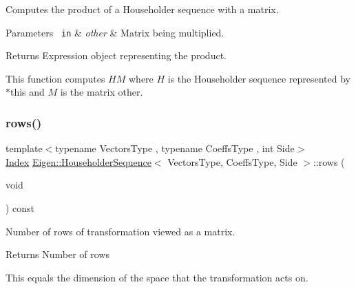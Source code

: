Computes the product of a Householder sequence with a matrix. 


\begin{DoxyParams}[1]{Parameters}
\mbox{\texttt{ in}}  & {\em other} & Matrix being multiplied. \\
\hline
\end{DoxyParams}
\begin{DoxyReturn}{Returns}
Expression object representing the product.
\end{DoxyReturn}
This function computes $ HM $ where $ H $ is the Householder sequence represented by {\ttfamily $\ast$this} and $ M $ is the matrix {\ttfamily other}. \mbox{\label{class_eigen_1_1_householder_sequence_a6eaafe2460930d1f4aa67d6e577b71f0}} 
\subsubsection{\texorpdfstring{rows()}{rows()}}
{\footnotesize\ttfamily template$<$typename Vectors\+Type , typename Coeffs\+Type , int Side$>$ \\
\mbox{\hyperlink{struct_eigen_1_1_eigen_base_a554f30542cc2316add4b1ea0a492ff02}{Index}} \mbox{\hyperlink{class_eigen_1_1_householder_sequence}{Eigen\+::\+Householder\+Sequence}}$<$ Vectors\+Type, Coeffs\+Type, Side $>$\+::rows (\begin{DoxyParamCaption}\item[{void}]{ }\end{DoxyParamCaption}) const\hspace{0.3cm}{\ttfamily [inline]}}



Number of rows of transformation viewed as a matrix. 

\begin{DoxyReturn}{Returns}
Number of rows
\end{DoxyReturn}
This equals the dimension of the space that the transformation acts on. \mbox{\label{class_eigen_1_1_householder_sequence_a30cc06d5b2ca4b7dcf5fcd53313d25fc}} 
